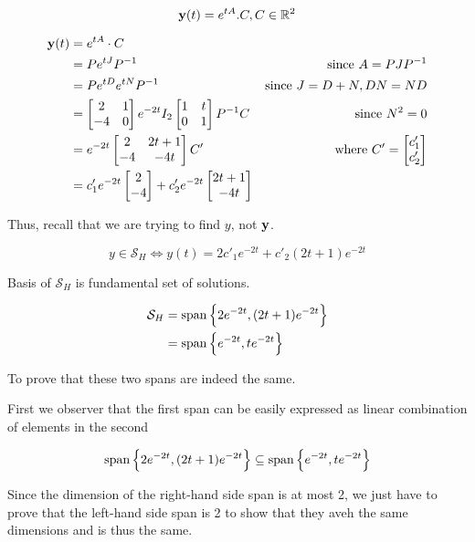 \begin{sol}
		\begin{equation}
			\bm{\mathrm{y}}(t) = e^{tA} . C, C \in \mathbb{R}^2
		\end{equation}

		\begin{align}
			\bm{\mathrm{y}}(t) &= e^{tA} \cdot C\\
			&= Pe^{tJ}P^{-1} &\text{since } A = PJP^{-1}\\
			&= P e^{tD} e^{tN} P^{-1} &\text{since } J = D + N, DN = ND\\
			&= \begin{bmatrix}
				2&1\\-4&0
			\end{bmatrix} e^{-2t} I_2 \begin{bmatrix}
				1&t\\0&1
			\end{bmatrix} P^{-1} C &\text{since } N^2 = 0\\
			&= e^{-2t} \begin{bmatrix}
				2 & 2t + 1\\-4 & -4t
			\end{bmatrix} C' &\text{where } C' = \begin{bmatrix}
				c'_1\\c'_2
			\end{bmatrix}\\
			&= c'_1 e^{-2t} \begin{bmatrix}
				2\\-4
			\end{bmatrix} + c'_2 e^{-2t} \begin{bmatrix}
				2t + 1\\-4t
			\end{bmatrix}
		\end{align}

		Thus, recall that we are trying to find $y$, not $\bm{\mathrm{y}}$.

		\begin{equation}
			y \in \mathcal{S}_H \iff y(t) = 2 c'_1 e^{-2t} + c'_2 (2t + 1) e^{-2t}
		\end{equation}

		Basis of $\mathcal{S}_H$ is fundamental set of solutions.

		\begin{align}
			\mathcal{S}_H &= \mathrm{span}\left\{2e^{-2t}, (2t + 1) e^{-2t}\right\}\\
			&= \mathrm{span}\left\{e^{-2t}, te^{-2t}\right\}
		\end{align}

		To prove that these two spans are indeed the same.

		First we observer that the first span can be easily expressed as linear combination of elements in the second

		\begin{equation} 
			\mathrm{span}\left\{2e^{-2t}, (2t + 1) e^{-2t}\right\} \subseteq \mathrm{span}\left\{e^{-2t}, te^{-2t}\right\}		
		\end{equation}

		Since the dimension of the right-hand side span is at most 2, we just have to prove that the left-hand side span is 2 to show that they aveh the same dimensions and is thus the same.
	\end{sol}

